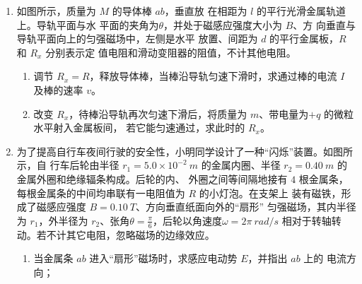 \begin{enumerate}
\item 
{}
如图所示，质量为 $ M $ 的导体棒 $ ab $，垂直放
在相距为 $ l $ 的平行光滑金属轨道上。导轨平面与水
平面的夹角为$ \theta $，并处于磁感应强度大小为 $ B $、方
向垂直与导轨平面向上的匀强磁场中，左侧是水平
放置、间距为 $ d $ 的平行金属板，$ R $ 和 $ R_{x} $ 分别表示定
值电阻和滑动变阻器的阻值，不计其他电阻。
\begin{enumerate}
\item
调节 $ R_{x} =R $，释放导体棒，当棒沿导轨匀速下滑时，求通过棒的电流 $ I $ 及棒的速率 $ v $。
\item 
改变 $ R_{x} $，待棒沿导轨再次匀速下滑后，将质量为 $ m $、带电量为$ +q $ 的微粒水平射入金属板间，
若它能匀速通过，求此时的 $ R_{x} $。


\end{enumerate}
\begin{figure}[h!]
\flushright

\end{figure}







\item
{}
为了提高自行车夜间行驶的安全性，小明同学设计了一种“闪烁”装置。如图所示，自
行车后轮由半径 $ r_{1} =5.0 \times 10^{-2} \ m $ 的金属内圈、半径 $ r_{2} =0.40 \ m $ 的金属外圈和绝缘辐条构成。后轮的内、
外圈之间等间隔地接有 $ 4 $ 根金属条，每根金属条的中间均串联有一电阻值为 $ R $ 的小灯泡。在支架上
装有磁铁，形成了磁感应强度 $ B=0.10 \ T $、方向垂直纸面向外的“扇形”
匀强磁场，其内半径为 $ r_{1} $，外半径为 $ r_{2} $、张角$ \theta =\frac{\pi}{6} $，后轮以角速度$ \omega =2 \pi \ rad/s $ 相对于转轴转动。若不计其它电阻，忽略磁场的边缘效应。
\begin{enumerate}
\item
当金属条 $ ab $ 进入“扇形”磁场时，求感应电动势 $ E $，并指出 $ ab $ 上的
电流方向；


\end{enumerate}
\end{enumerate}
